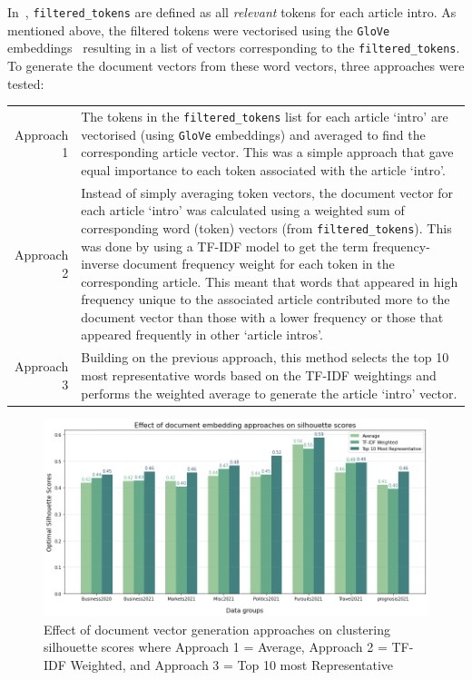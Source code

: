 In~, \texttt{filtered\_tokens} are defined as all \textit{relevant} tokens for each article intro. As mentioned above, the filtered tokens were vectorised using the \texttt{GloVe} embeddings~\cite{glove} resulting in a list of vectors corresponding to the \texttt{filtered\_tokens}. To generate the document vectors from these word vectors, three approaches were tested: 

\renewcommand\arraystretch{2}
\captionsetup{singlelinecheck=false, labelfont=sc, labelsep=quad}
\begin{longtable}{@{\,}r <{\hskip 2pt} !{\foo} >{\arraybackslash}p{14cm}}
\centering

Approach 1 & The tokens in the \texttt{filtered\_tokens} list for each article `intro' are vectorised (using \texttt{GloVe} embeddings) and averaged to find the corresponding article vector. This was a simple approach that gave equal importance to each token associated with the article `intro'. \\

Approach 2 & Instead of simply averaging token vectors, the document vector for each article `intro' was calculated using a weighted sum of corresponding word (token) vectors (from \texttt{filtered\_tokens}). This was done by using a TF-IDF model to get the term frequency-inverse document frequency weight for each token in the corresponding article. This meant that words that appeared in high frequency unique to the associated article contributed more to the document vector than those with a lower frequency or those that appeared frequently in other `article intros'. \\

Approach 3 & Building on the previous approach, this method selects the top 10 most representative words based on the TF-IDF weightings and performs the weighted average to generate the article `intro' vector.\\
\end{longtable}
\vspace{-1ex}
\begin{figure}[H]
  \centering
  \includegraphics[width=0.9\linewidth]{images/eval/doc_embedding_sil.png}
  \caption{Effect of document vector generation approaches on clustering silhouette scores where Approach 1 = Average, Approach 2 = TF-IDF Weighted, and Approach 3 = Top 10 most Representative }
  \label{fig:doc_embeddings}
  \end{figure}

